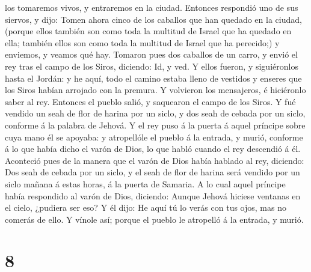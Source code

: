 los tomaremos vivos, y entraremos en la ciudad.  Entonces
respondió uno de sus siervos, y dijo: Tomen ahora cinco de los caballos
que han quedado en la ciudad, (porque ellos también son como toda la
multitud de Israel que ha quedado en ella; también ellos son como toda
la multitud de Israel que ha perecido;) y enviemos, y veamos qué hay.
 Tomaron pues dos caballos de un carro, y envió el rey tras
el campo de los Siros, diciendo: Id, y ved.  Y ellos
fueron, y siguiéronlos hasta el Jordán: y he aquí, todo el camino estaba
lleno de vestidos y enseres que los Siros habían arrojado con la
premura. Y volvieron los mensajeros, é hiciéronlo saber al rey.
 Entonces el pueblo salió, y saquearon el campo de los
Siros. Y fué vendido un seah de flor de harina por un siclo, y dos seah
de cebada por un siclo, conforme á la palabra de Jehová.  Y
el rey puso á la puerta á aquel príncipe sobre cuya mano él se apoyaba:
y atropellóle el pueblo á la entrada, y murió, conforme á lo que había
dicho el varón de Dios, lo que habló cuando el rey descendió á él.
 Aconteció pues de la manera que el varón de Dios había
hablado al rey, diciendo: Dos seah de cebada por un siclo, y el seah de
flor de harina será vendido por un siclo mañana á estas horas, á la
puerta de Samaria.  A lo cual aquel príncipe había
respondido al varón de Dios, diciendo: Aunque Jehová hiciese ventanas en
el cielo, ¿pudiera ser eso? Y él dijo: He aquí tú lo verás con tus ojos,
mas no comerás de ello.  Y vínole así; porque el pueblo le
atropelló á la entrada, y murió.

\hypertarget{section-7}{%
\section{8}\label{section-7}}

